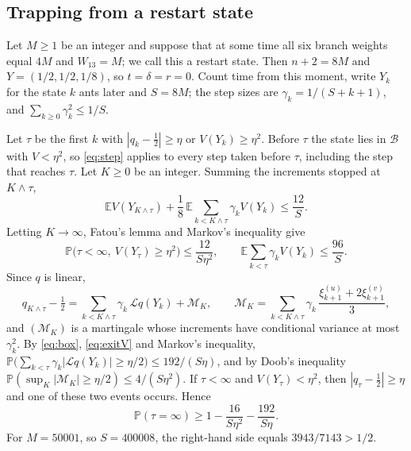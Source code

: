 \documentclass[11pt]{amsart}
\theoremstyle{remark}
\newcommand{\E}{\mathbb{E}}
\renewcommand{\P}{\mathbb{P}}
\begin{document}
\subsection{Trapping from a restart state}
Let $M\ge1$ be an integer and suppose that at some time all six branch weights equal $4M$ and $W_{13}=M$; we call this a restart state. Then $n+2=8M$ and $Y=(1/2,1/2,1/8)$, so $t=\delta=r=0$. Count time from this moment, write $Y_k$ for the state $k$ ants later and $S=8M$; the step sizes are $\gamma_k=1/(S+k+1)$, and $\sum_{k\ge0}\gamma_k^2\le1/S$.

Let $\tau$ be the first $k$ with $|q_k-\frac12|\ge\eta$ or $V(Y_k)\ge\eta^2$. Before $\tau$ the state lies in $\mathcal B$ with $V<\eta^2$, so \eqref{eq:step} applies to every step taken before $\tau$, including the step that reaches $\tau$. Let $K\ge0$ be an integer. Summing the increments stopped at $K\wedge\tau$,
\begin{equation}\label{eq:sum}
\E V(Y_{K\wedge\tau})+\frac18\,\E\sum_{k<K\wedge\tau}\gamma_kV(Y_k)\le\frac{12}S .
\end{equation}
Letting $K\to\infty$, Fatou's lemma and Markov's inequality give
\begin{equation}\label{eq:exitV}
\P\bigl(\tau<\infty,\ V(Y_\tau)\ge\eta^2\bigr)\le\frac{12}{S\eta^2},\qquad \E\sum_{k<\tau}\gamma_kV(Y_k)\le\frac{96}S .
\end{equation}
Since $q$ is linear,
\[
q_{K\wedge\tau}-\tfrac12=\sum_{k<K\wedge\tau}\gamma_k\,\mathcal Lq(Y_k)+\mathcal M_K,\qquad \mathcal M_K=\sum_{k<K\wedge\tau}\gamma_k\,\frac{\xi^{(u)}_{k+1}+2\xi^{(v)}_{k+1}}3 ,
\]
and $(\mathcal M_K)$ is a martingale whose increments have conditional variance at most $\gamma_k^2$. By \eqref{eq:box}, \eqref{eq:exitV} and Markov's inequality, $\P\bigl(\sum_{k<\tau}\gamma_k|\mathcal Lq(Y_k)|\ge\eta/2\bigr)\le192/(S\eta)$, and by Doob's inequality $\P(\sup_K|\mathcal M_K|\ge\eta/2)\le4/(S\eta^2)$. If $\tau<\infty$ and $V(Y_\tau)<\eta^2$, then $|q_\tau-\frac12|\ge\eta$ and one of these two events occurs. Hence
\begin{equation}\label{eq:trap}
\P(\tau=\infty)\ge1-\frac{16}{S\eta^2}-\frac{192}{S\eta}.
\end{equation}
For $M=50001$, so $S=400008$, the right-hand side equals $3943/7143>1/2$.
\end{document}
